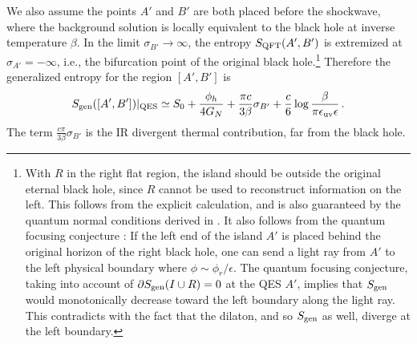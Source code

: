 \documentclass[12pt]{article}
\newcommand{\f}{\frac}
\newcommand{\ra}{\rangle}
\let\sg=\sigma \let\t=\tau \let\u=\upsilon \let\c=\chi
\let\f=\frac
\def\ba{\begin{eqnarray}}
\def\ea{\end{eqnarray}}
\numberwithin{equation}{section}
\def\ep{{\epsilon}}
\def\t{{\theta}}
\def\sg{{\sigma}}
\def\pp{\partial}
\def\ba{\begin{eqnarray}}
\def\ea{\end{eqnarray}}
\def\f {\frac}
\def\ep{\epsilon}
\def\ra{\rightarrow}
\begin{document}
\begin{spacing}{1.1}
We also assume the points $A'$ and $B'$ are both placed before the shockwave, where the background solution is locally equivalent to the black hole at inverse temperature $\beta$.  In the limit $\sg_{B'}\ra\infty$, the entropy $S_{\rm QFT}(A',B')$ is extremized at $\sg_{A'}=-\infty$, i.e., the bifurcation point of the original black hole.\footnote{With $R$ in the right flat region, the island should be outside the original eternal black hole, since $R$ cannot be used to reconstruct information on the left. This follows from the explicit calculation, and is also guaranteed by the quantum normal conditions derived in \cite{Almheiri:2019psf,Hartman:2020khs}. It also follows from the quantum focusing conjecture \cite{Almheiri:2019yqk}: If the left end of the island $A'$ is placed behind the original horizon of the right black hole, one can send a light ray from $A'$ to the left physical boundary where $\phi\sim\phi_r/\ep$. The quantum focusing conjecture, taking into account of $\pp S_{\rm gen}(I \cup R)=0$ at the QES $A'$,  implies that $S_{\rm gen}$ would monotonically decrease toward the left boundary along the light ray. This contradicts with the fact that the dilaton, and so $S_{\rm gen}$ as well, diverge at the left boundary.} Therefore the generalized entropy for the region $[A',B']$ is
 \ba
S_{\rm gen}([A',B'])|_{\rm QES}\simeq S_0+\f{\phi_h}{4G_N}%
 + \frac{\pi c}{3\beta}\sigma_{B'} + \frac{c}{6}\log \frac{\beta}{\pi\epsilonuv\ep}\, .
\ea
The term $\f{c\pi}{3\beta}\sg_{B'}$ is the IR divergent thermal contribution, far from the black hole.



\end{spacing}
\end{document}
